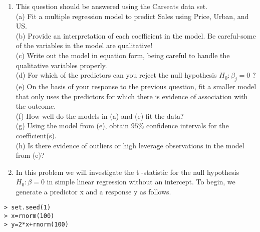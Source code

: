 \documentclass[10pt]{article}
\begin{document}
\begin{enumerate}
(d) Use the plot() function to produce diagnostic plots of the linear regression fit. Comment on any problems you see with the fit. Do the residual plots suggest any unusually large outliers? Does the leverage plot identify any observations with unusually high leverage?\\
(e) Use the $*$ and : symbols to fit linear regression models with interaction effects. Do any interactions appear to be statistically significant?\\
(f) Try a few different transformations of the variables, such as $\log (X), \sqrt{X}, X^{2}$. Comment on your findings.
  \item This question should be answered using the Carseats data set.\\
(a) Fit a multiple regression model to predict Sales using Price, Urban, and US.\\
(b) Provide an interpretation of each coefficient in the model. Be careful-some of the variables in the model are qualitative!\\
(c) Write out the model in equation form, being careful to handle the qualitative variables properly.\\
(d) For which of the predictors can you reject the null hypothesis $H_{0}: \beta_{j}=0$ ?\\
(e) On the basis of your response to the previous question, fit a smaller model that only uses the predictors for which there is evidence of association with the outcome.\\
(f) How well do the models in (a) and (e) fit the data?\\
(g) Using the model from (e), obtain $95 \%$ confidence intervals for the coefficient(s).\\
(h) Is there evidence of outliers or high leverage observations in the model from (e)?
  \item In this problem we will investigate the t -statistic for the null hypothesis $H_{0}: \beta=0$ in simple linear regression without an intercept. To begin, we generate a predictor x and a response y as follows.
\end{enumerate}

\begin{verbatim}
> set.seed(1)
> x=rnorm(100)
> y=2*x+rnorm(100)
\end{verbatim}
\end{document}
